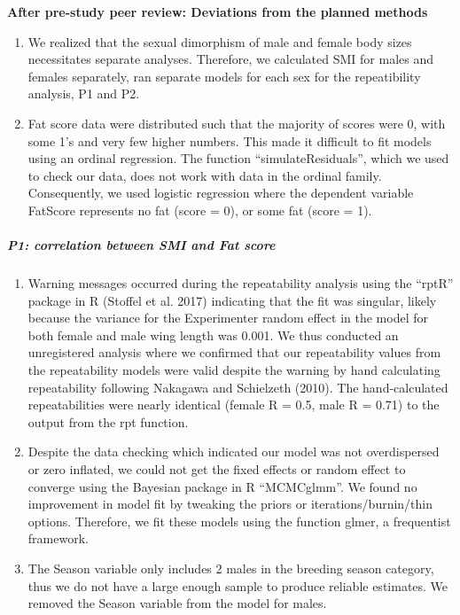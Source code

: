 \documentclass[
]{article}
\begin{document}
\textbf{After pre-study peer review: Deviations from the planned
methods}

\begin{enumerate}
\def\labelenumi{\arabic{enumi})}
\item
  We realized that the sexual dimorphism of male and female body sizes
  necessitates separate analyses. Therefore, we calculated SMI for males
  and females separately, ran separate models for each sex for the
  repeatibility analysis, P1 and P2.
\item
  Fat score data were distributed such that the majority of scores were
  0, with some 1's and very few higher numbers. This made it difficult
  to fit models using an ordinal regression. The function
  ``simulateResiduals'', which we used to check our data, does not work
  with data in the ordinal family. Consequently, we used logistic
  regression where the dependent variable FatScore represents no fat
  (score = 0), or some fat (score = 1).
\end{enumerate}

\hypertarget{p1-correlation-between-smi-and-fat-score}{%
\subparagraph{P1: correlation between SMI and Fat
score}\label{p1-correlation-between-smi-and-fat-score}}

\begin{enumerate}
\def\labelenumi{\arabic{enumi})}
\setcounter{enumi}{2}
\item
  Warning messages occurred during the repeatability analysis using the
  ``rptR'' package in R (Stoffel et al. 2017) indicating that the fit
  was singular, likely because the variance for the Experimenter random
  effect in the model for both female and male wing length was 0.001. We
  thus conducted an unregistered analysis where we confirmed that our
  repeatability values from the repeatability models were valid despite
  the warning by hand calculating repeatability following Nakagawa and
  Schielzeth (2010). The hand-calculated repeatabilities were nearly
  identical (female R = 0.5, male R = 0.71) to the output from the rpt
  function.
\item
  Despite the data checking which indicated our model was not
  overdispersed or zero inflated, we could not get the fixed effects or
  random effect to converge using the Bayesian package in R
  ``MCMCglmm''. We found no improvement in model fit by tweaking the
  priors or iterations/burnin/thin options. Therefore, we fit these
  models using the function glmer, a frequentist framework.
\item
  The Season variable only includes 2 males in the breeding season
  category, thus we do not have a large enough sample to produce
  reliable estimates. We removed the Season variable from the model for
  males.
\end{enumerate}
\end{document}
